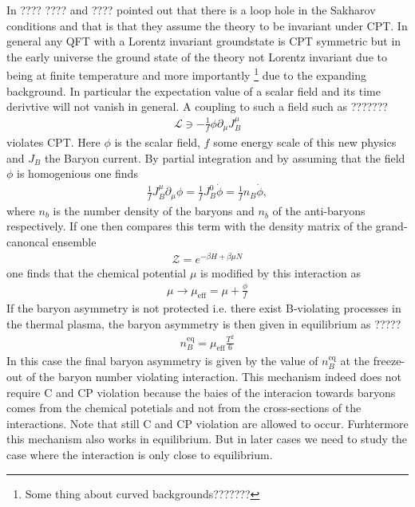 \documentclass[13pt,a4paper,twoside,titlepage]{article}
\begin{document}
In ???? ???? and ???? pointed out that there is a loop hole in the Sakharov conditions
and that is that they assume the theory to be invariant under CPT.
In general any QFT with a Lorentz invariant groundstate is CPT symmetric but in the early universe the ground state of the theory not Lorentz invariant due to being at finite temperature and more importantly \footnote{Some thing about curved backgrounds???????}
due to the expanding background. In particular the expectation value of a scalar field and its time derivtive will not vanish in general. A coupling to such a field such as ???????
\begin{align}
    \mathcal{L} \ni - \frac{1}{f} \phi \partial_\mu J^\mu_B
\end{align}
violates CPT. Here $\phi$ is the scalar field, $f$ some energy scale of this new physics and $J_B$ the Baryon current.
By partial integration and by assuming that the field $\phi$ is homogenious one finds
\begin{align}
    \frac{1}{f} J_B^\mu \partial_\mu \phi = \frac{1}{f} J_B^0 \dot{\phi}
    = \frac{1}{f} n_B \dot{\phi},
\end{align}
where $n_b$ is the number density of the baryons and $n_{\bar{b}}$ of the anti-baryons respectively.
If one then compares this term with the density matrix of the grand-canoncal ensemble
\begin{align}
    \mathcal{Z} = e^{-\beta H + \beta \mu N}
\end{align}
one finds that the chemical potential $\mu$ is modified by this
interaction as
\begin{align}
    \mu \to \mu_\mathrm{eff} = \mu + \frac{\phi}{f}
\end{align}
If the baryon asymmetry is not protected i.e. there exist B-violating processes in the thermal plasma, the baryon asymmetry is then given in equilibrium as ?????
\begin{align}
    n_B^\mathrm{eq} = \mu_\mathrm{eff} \frac{T^2}{6}
\end{align}
In this case the final baryon asymmetry is given by the value of $n^\mathrm{eq}_B$ at the freeze-out of the baryon number violating interaction.
This mechanism indeed does not require C and CP violation because the baies of the interacion towards baryons comes from the chemical potetials and not from the cross-sections of the interactions.
Note that still C and CP violation are allowed to occur.
Furhtermore this mechanism also works in equilibrium.
But in later cases we need to study the case where the interaction is only close to equilibrium.
\end{document}
